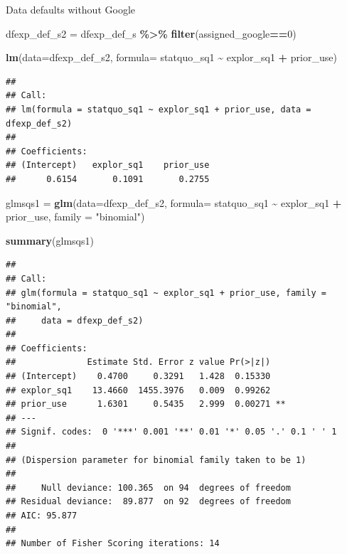 \documentclass[
  11pt,
]{article}
\newenvironment{Shaded}{\begin{snugshade}}{\end{snugshade}}
\newcommand{\AttributeTok}[1]{\textcolor[rgb]{0.13,0.29,0.53}{#1}}
\newcommand{\DecValTok}[1]{\textcolor[rgb]{0.00,0.00,0.81}{#1}}
\newcommand{\FunctionTok}[1]{\textcolor[rgb]{0.13,0.29,0.53}{\textbf{#1}}}
\newcommand{\NormalTok}[1]{#1}
\newcommand{\OtherTok}[1]{\textcolor[rgb]{0.56,0.35,0.01}{#1}}
\newcommand{\SpecialCharTok}[1]{\textcolor[rgb]{0.81,0.36,0.00}{\textbf{#1}}}
\newcommand{\StringTok}[1]{\textcolor[rgb]{0.31,0.60,0.02}{#1}}
\begin{document}
Data defaults without Google

\begin{Shaded}
\begin{Highlighting}[]
\NormalTok{dfexp\_def\_s2 }\OtherTok{=}\NormalTok{ dfexp\_def\_s }\SpecialCharTok{\%\textgreater{}\%} 
  \FunctionTok{filter}\NormalTok{(assigned\_google}\SpecialCharTok{==}\DecValTok{0}\NormalTok{)}
\end{Highlighting}
\end{Shaded}

\begin{Shaded}
\begin{Highlighting}[]
\FunctionTok{lm}\NormalTok{(}\AttributeTok{data=}\NormalTok{dfexp\_def\_s2, }\AttributeTok{formula=}\NormalTok{ statquo\_sq1 }\SpecialCharTok{\textasciitilde{}}\NormalTok{ explor\_sq1 }\SpecialCharTok{+}\NormalTok{ prior\_use)}
\end{Highlighting}
\end{Shaded}

\begin{verbatim}
## 
## Call:
## lm(formula = statquo_sq1 ~ explor_sq1 + prior_use, data = dfexp_def_s2)
## 
## Coefficients:
## (Intercept)   explor_sq1    prior_use  
##      0.6154       0.1091       0.2755
\end{verbatim}

\begin{Shaded}
\begin{Highlighting}[]
\NormalTok{glmsqs1 }\OtherTok{=} \FunctionTok{glm}\NormalTok{(}\AttributeTok{data=}\NormalTok{dfexp\_def\_s2, }\AttributeTok{formula=}\NormalTok{ statquo\_sq1 }\SpecialCharTok{\textasciitilde{}}\NormalTok{ explor\_sq1 }\SpecialCharTok{+}\NormalTok{ prior\_use, }\AttributeTok{family =} \StringTok{"binomial"}\NormalTok{)}

\FunctionTok{summary}\NormalTok{(glmsqs1)}
\end{Highlighting}
\end{Shaded}

\begin{verbatim}
## 
## Call:
## glm(formula = statquo_sq1 ~ explor_sq1 + prior_use, family = "binomial", 
##     data = dfexp_def_s2)
## 
## Coefficients:
##              Estimate Std. Error z value Pr(>|z|)   
## (Intercept)    0.4700     0.3291   1.428  0.15330   
## explor_sq1    13.4660  1455.3976   0.009  0.99262   
## prior_use      1.6301     0.5435   2.999  0.00271 **
## ---
## Signif. codes:  0 '***' 0.001 '**' 0.01 '*' 0.05 '.' 0.1 ' ' 1
## 
## (Dispersion parameter for binomial family taken to be 1)
## 
##     Null deviance: 100.365  on 94  degrees of freedom
## Residual deviance:  89.877  on 92  degrees of freedom
## AIC: 95.877
## 
## Number of Fisher Scoring iterations: 14
\end{verbatim}
\end{document}
